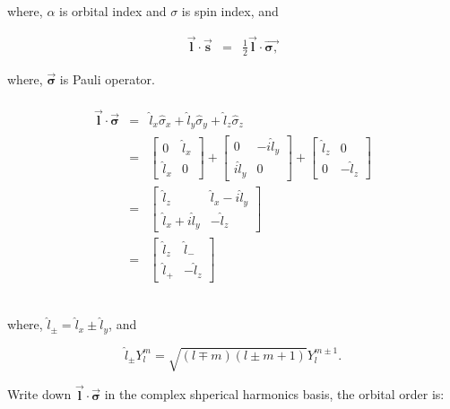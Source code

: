 where, $\alpha$ is orbital index and $\sigma$ is spin index, and 

\begin{eqnarray}
\vec{\mathbf{l}}\cdot\vec{\mathbf{s}} & = & \frac{1}{2}\vec{\mathbf{l}}\cdot\vec{\mathbf{\mathbf{\sigma},}}
\end{eqnarray}


where, $\vec{\mathbf{\sigma}}$ is Pauli operator.

\begin{eqnarray*}
\end{eqnarray*}
\begin{eqnarray*}
\vec{\mathbf{l}}\cdot\vec{\mathbf{\sigma}} & = & \hat{l}_{x}\hat{\sigma}_{x}+\hat{l}_{y}\hat{\sigma}_{y}+\hat{l}_{z}\hat{\sigma}_{z}\\
 & = & \left[\begin{array}{cc}
0 & \hat{l}_{x}\\
\hat{l}_{x} & 0
\end{array}\right]+\left[\begin{array}{cc}
0 & -i\hat{l}_{y}\\
i\hat{l}_{y} & 0
\end{array}\right]+\left[\begin{array}{cc}
\hat{l}_{z} & 0\\
0 & -\hat{l}_{z}
\end{array}\right]\\
 & = & \left[\begin{array}{cc}
\hat{l}_{z} & \hat{l}_{x}-i\hat{l}_{y}\\
\hat{l}_{x}+i\hat{l}_{y} & -\hat{l}_{z}
\end{array}\right]\\
 & = & \left[\begin{array}{cc}
\hat{l}_{z} & \hat{l}_{-}\\
\hat{l}_{+} & -\hat{l}_{z}
\end{array}\right]
\end{eqnarray*}


\begin{eqnarray*}
\end{eqnarray*}


where, $\hat{l}_{\pm}=\hat{l}_{x}\pm\hat{l}_{y}$, and

\begin{equation}
\hat{l}_{\pm}Y_{l}^{m}=\sqrt{(l\mp m)(l\pm m+1)}Y_{l}^{m\pm1}.
\end{equation}


Write down $\vec{\mathbf{l}}\cdot\vec{\mathbf{\sigma}}$ in the complex
shperical harmonics basis, the orbital order is:

